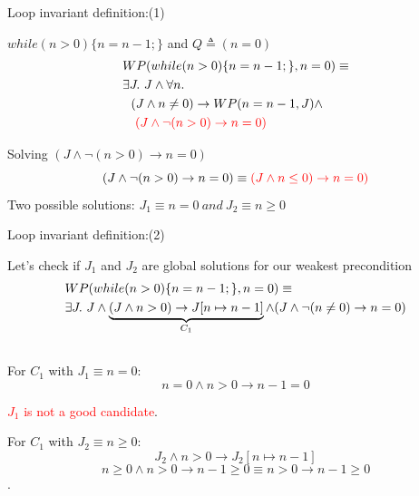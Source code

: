 \begin{frame}{Loop invariant definition:(1)}
\begin{exampleblock}{$while(n > 0) \{n=n-1;\}$ and $Q \triangleq (n=0)$}
	\footnotesize{
		\begin{equation} \label{eq1}
		\begin{split}
		\color{blue}&WP(while(n > 0) \{n=n-1;\}, n=0) \equiv\\
		& \exists J.~J \wedge \forall n.\\
		& ~~  (J \wedge n \neq 0 ) \rightarrow  WP(n=n-1, J) \color{black} \wedge\\
		& ~~~\color{red}(J \wedge \neg (n > 0) \rightarrow n = 0 )\\
		\end{split}
		\end{equation}}
	\end{exampleblock}

\begin{exampleblock}{Solving $(J \wedge \neg (n > 0) \rightarrow n = 0 )$}
	\footnotesize{
		\begin{equation} 		
(J \wedge \neg (n > 0) \rightarrow n = 0 ) \equiv\color{red} (J \wedge n \leq 0) \rightarrow n = 0 )
		\end{equation}}
  Two possible solutions: $J_1 \equiv n = 0 ~and~ J_2 \equiv n \geq  0  $
\end{exampleblock}

\end{frame}
\begin{frame}{Loop invariant definition:(2)}
\begin{exampleblock}{ Let's check if $J_1$ and $J_2$ are global solutions for our weakest precondition}
	\footnotesize{
		\begin{equation} 
		\begin{split}
		\color{blue}& WP(while(n > 0) \{n=n-1;\}, n=0) \equiv\\
		&\exists J.~ J \wedge \underbrace{(J \wedge n > 0 ) \rightarrow  J[n \mapsto n-1]}_{C_1} \color{black} \wedge (J \wedge \neg (n \neq 0) \rightarrow n = 0 )\\\\
		\end{split}
		\end{equation}}
	For $C_1$ with $J_1 \equiv n = 0$:\\
\[n = 0 \wedge n > 0 \rightarrow n-1 =0\]  {\centering\textcolor{red}{$J_1$ is not a good candidate}.\par} 

For  $C_1$ with $J_2 \equiv n \geq 0$:\\
\[J_2 \wedge n > 0  \rightarrow  J_2[n \mapsto n-1]\]
\[n \geq 0 \wedge n > 0 \rightarrow n-1 \geq 0 \equiv 
n > 0 \rightarrow n-1 \geq 0\]
\centering\color{green!55!black}{$J_2$ is the loop invariant}.\\
\end{exampleblock}
\end{frame}

